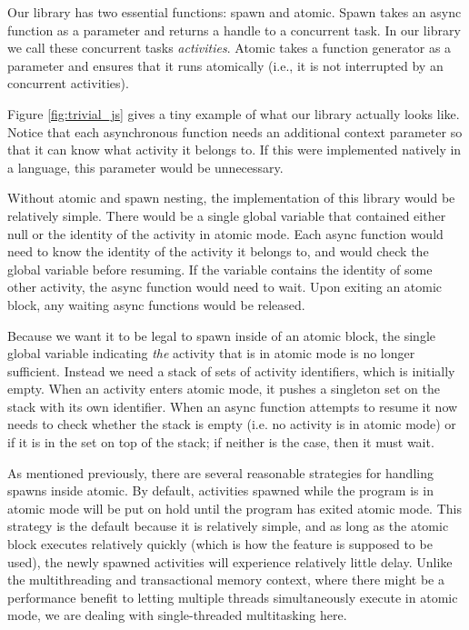 \documentclass[acmsmall,anonymous,review]{acmart}\settopmatter{printfolios=true,printccs=false,printacmref=false}
\begin{document}
Our library has two essential functions: spawn and atomic.
Spawn takes an async function as a parameter and returns a handle to a concurrent task.
In our library we call these concurrent tasks \emph{activities}.
Atomic takes a function generator as a parameter and ensures that it runs atomically (i.e., it is not interrupted by an concurrent activities).

Figure \ref{fig:trivial_js} gives a tiny example of what our library actually looks like.
Notice that each asynchronous function needs an additional context parameter so that it can know what activity it belongs to.
If this were implemented natively in a language, this parameter would be unnecessary.

Without atomic and spawn nesting, the implementation of this library would be relatively simple.
There would be a single global variable that contained either null or the identity of the activity in atomic mode.
Each async function would need to know the identity of the activity it belongs to, and would check the global variable before resuming.
If the variable contains the identity of some other activity, the async function would need to wait.
Upon exiting an atomic block, any waiting async functions would be released.

Because we want it to be legal to spawn inside of an atomic block, the single global variable indicating \emph{the} activity that is in atomic mode is no longer sufficient.
Instead we need a stack of sets of activity identifiers, which is initially empty.
When an activity enters atomic mode, it pushes a singleton set on the stack with its own identifier.
When an async function attempts to resume it now needs to check whether the stack is empty (i.e. no activity is in atomic mode) or if it is in the set on top of the stack; if neither is the case, then it must wait.

As mentioned previously, there are several reasonable strategies for handling spawns inside atomic.
By default, activities spawned while the program is in atomic mode will be put on hold until the program has exited atomic mode.
This strategy is the default because it is relatively simple, and as long as the atomic block executes relatively quickly (which is how the feature is supposed to be used), the newly spawned activities will experience relatively little delay.
Unlike the multithreading and transactional memory context, where there might be a performance benefit to letting multiple threads simultaneously execute in atomic mode, we are dealing with single-threaded multitasking here.
\end{document}
